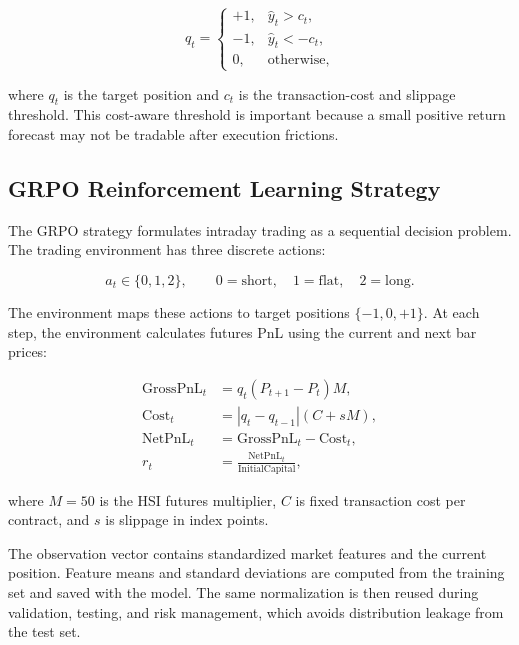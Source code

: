 \documentclass[11pt,a4paper]{article}
\begin{document}
\begin{equation}
    q_t =
    \begin{cases}
        +1, & \hat{y}_t > c_t,\\
        -1, & \hat{y}_t < -c_t,\\
        0, & \text{otherwise},
    \end{cases}
\end{equation}

where $q_t$ is the target position and $c_t$ is the transaction-cost and slippage threshold. This cost-aware threshold is important because a small positive return forecast may not be tradable after execution frictions.

\subsection{GRPO Reinforcement Learning Strategy}

The GRPO strategy formulates intraday trading as a sequential decision problem. The trading environment has three discrete actions:

\begin{equation}
    a_t \in \{0,1,2\}, \qquad 0=\text{short}, \quad 1=\text{flat}, \quad 2=\text{long}.
\end{equation}

The environment maps these actions to target positions $\{-1,0,+1\}$. At each step, the environment calculates futures PnL using the current and next bar prices:

\begin{align}
    \mathrm{GrossPnL}_t &= q_t(P_{t+1}-P_t)M,\\
    \mathrm{Cost}_t &= |q_t-q_{t-1}|(C + sM),\\
    \mathrm{NetPnL}_t &= \mathrm{GrossPnL}_t - \mathrm{Cost}_t,\\
    r_t &= \frac{\mathrm{NetPnL}_t}{\mathrm{InitialCapital}},
\end{align}

where $M=50$ is the HSI futures multiplier, $C$ is fixed transaction cost per contract, and $s$ is slippage in index points.

The observation vector contains standardized market features and the current position. Feature means and standard deviations are computed from the training set and saved with the model. The same normalization is then reused during validation, testing, and risk management, which avoids distribution leakage from the test set.
\end{document}
